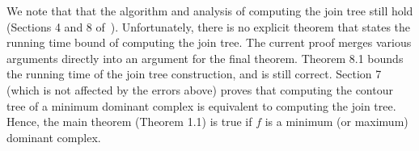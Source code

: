 \documentclass[11pt]{article}
\theoremstyle{definition}
\begin{document}
% 
% 
% 

We note that that the algorithm and analysis of computing the join tree still hold (Sections 4 and 8 of~\cite{rs-17}). 
Unfortunately, there is no explicit theorem that states the running time bound of computing the join tree. The current
proof merges various arguments directly into an argument for the final theorem. Theorem 8.1 bounds the running time 
of the join tree construction, and is still correct. Section 7 (which is not affected by the errors above)
proves that computing the contour tree of a minimum dominant complex is equivalent to computing
the join tree. Hence, the main theorem (Theorem 1.1)
is true if $f$ is a minimum (or maximum) dominant complex.



\end{document}
